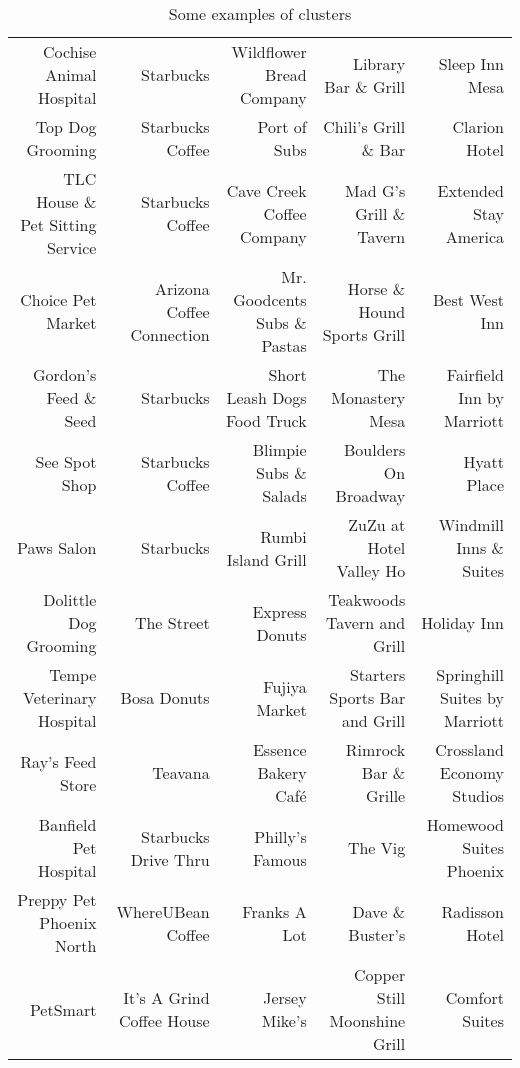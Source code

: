 \documentclass[12pt]{article}
\begin{document}
\begin{table}[htbp]
{\begin{tabular}{rrrrr}
     Cochise Animal Hospital & Starbucks & Wildflower Bread Company & Library Bar \& Grill & Sleep Inn Mesa \\
     Top Dog Grooming & Starbucks Coffee &  Port of Subs & Chili's Grill \& Bar & Clarion Hotel \\
     TLC House \& Pet Sitting Service &  Starbucks Coffee & Cave Creek Coffee Company & Mad G's Grill \& Tavern & Extended Stay America \\
     Choice Pet Market &  Arizona Coffee Connection & Mr. Goodcents Subs \& Pastas & Horse \& Hound Sports Grill & Best West Inn \\
     Gordon's Feed \& Seed & Starbucks & Short Leash Dogs Food Truck & The Monastery Mesa & Fairfield Inn by Marriott \\
     See Spot Shop & Starbucks Coffee & Blimpie Subs \& Salads & Boulders On Broadway & Hyatt Place \\
     Paws Salon & Starbucks & Rumbi Island Grill & ZuZu at Hotel Valley Ho & Windmill Inns \& Suites \\
     Dolittle Dog Grooming &  The Street & Express Donuts & Teakwoods Tavern and Grill & Holiday Inn \\
     Tempe Veterinary Hospital &  Bosa Donuts & Fujiya Market & Starters Sports Bar and Grill & Springhill Suites by Marriott \\
     Ray's Feed Store &  Teavana &  Essence Bakery Café & Rimrock Bar \& Grille & Crossland Economy Studios \\
     Banfield Pet Hospital &  Starbucks Drive Thru & Philly's Famous & The Vig & Homewood Suites Phoenix \\
     Preppy Pet Phoenix North & WhereUBean Coffee &  Franks A Lot & Dave \& Buster's & Radisson Hotel \\
     PetSmart & It's A Grind Coffee House &  Jersey Mike's & Copper Still Moonshine Grill & Comfort Suites \\
    \bottomrule
    \end{tabular}%
}\caption {Some examples of clusters}\label{clusters2}\end{table}%


\newpage
\end{document}
